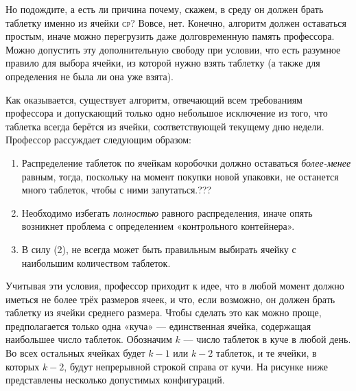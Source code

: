 Но подождите, а есть ли причина почему, скажем, в среду он должен брать таблетку именно из ячейки \textsc{ср}? Вовсе, нет.
Конечно, алгоритм должен оставаться простым, иначе можно перегрузить даже долговременную память профессора.
Можно допустить эту дополнительную свободу при условии, что есть разумное правило для выбора ячейки, из которой нужно взять таблетку (а также для определения не была ли она уже взята).

Как оказывается, существует алгоритм, отвечающий всем требованиям профессора и допускающий только одно небольшое исключение из того, что таблетка всегда берётся из ячейки, соответствующей текущему дню недели.
Профессор рассуждает следующим образом:

\begin{enumerate}[(1)]
\item Распределение таблеток по ячейкам коробочки должно оставаться \emph{более-менее} равным, тогда, поскольку на момент покупки новой упаковки, не останется много таблеток, чтобы с ними запутаться.???
\item Необходимо избегать \emph{полностью} равного распределения, иначе опять возникнет проблема с определением «контрольного контейнера».
\item В силу (2), не всегда может быть правильным выбирать ячейку с наибольшим количеством таблеток.
\end{enumerate}

Учитывая эти условия, профессор приходит к идее, что в любой момент должно иметься не более трёх размеров ячеек, и что, если возможно, он должен брать таблетку из ячейки среднего размера.
Чтобы сделать это как можно проще, предполагается только одна «куча» --- единственная ячейка, содержащая наибольшее число таблеток.
Обозначим $k$ --- число таблеток в куче в любой день.
Во всех остальных ячейках будет $k-1$ или $k-2$ таблеток, и те ячейки, в которых $k-2$, будут непрерывной строкой справа от кучи.
На рисунке ниже представлены несколько допустимых конфигураций.

